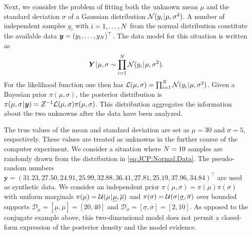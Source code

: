 Next, we consider the problem of fitting both the unknown mean \(\mu\) and the standard deviation \(\sigma\) of a Gaussian distribution \(\mathcal{N}(y_i {\:\!}|{\:\!} \mu,\sigma^2)\).
A number of independent samples \(y_i\) with \(i = 1,\ldots,N\) from the normal distribution constitute the available data \(\bm{y} = (y_1,\ldots,y_N)^\top\).
The data model for this situation is written as
\begin{equation} \label{eq:JCP:Normal:Data}
  \bm{Y} {\:\!}|{\:\!} \mu,\sigma \sim \prod\limits_{i=1}^N \mathcal{N}(y_i {\:\!}|{\:\!} \mu,\sigma^2).
\end{equation}
For the likelihood function one then has \(\mathcal{L}(\mu,\sigma) = \prod_{i=1}^{N} \mathcal{N}(y_i {\:\!}|{\:\!} \mu,\sigma^2)\).
Given a Bayesian prior \(\pi(\mu,\sigma)\), the posterior distribution is \(\pi(\mu,\sigma {\:\!}|{\:\!} \bm{y}) = Z^{-1} \mathcal{L}(\mu,\sigma) \pi(\mu,\sigma)\).
This distribution aggregates the information about the two unknowns after the data have been analyzed.
\par %
The true values of the mean and standard deviation are set as \(\mu = 30\) and \(\sigma = 5\), respectively.
These values are treated as unknowns in the further course of the computer experiment.
We consider a situation where \(N = 10\) samples are randomly drawn from the distribution in \cref{eq:JCP:Normal:Data}.
The pseudo-random numbers \(\bm{y} = (31.23,27.50,24.91,25.99,32.88,36.41,27.81,25.19,37.96,34.84)^\top\) are used as synthetic data.
We consider an independent prior \(\pi(\mu,\sigma) = \pi(\mu) \pi(\sigma)\) with uniform marginals
\(\pi(\mu) = \mathcal{U}(\mu {\:\!}|{\:\!} \underline{\mu},\overline{\mu})\) and \(\pi(\sigma) = \mathcal{U}(\sigma {\:\!}|{\:\!} \underline{\sigma},\overline{\sigma})\)
over bounded supports \(\mathcal{D}_{\mu} = [\underline{\mu},\overline{\mu}] = [20,40]\) and \(\mathcal{D}_{\sigma} = [\underline{\sigma},\overline{\sigma}] = [2,10]\).
As opposed to the conjugate example above, this two-dimensional model does not permit a closed-form expression of the posterior density and the model evidence.

